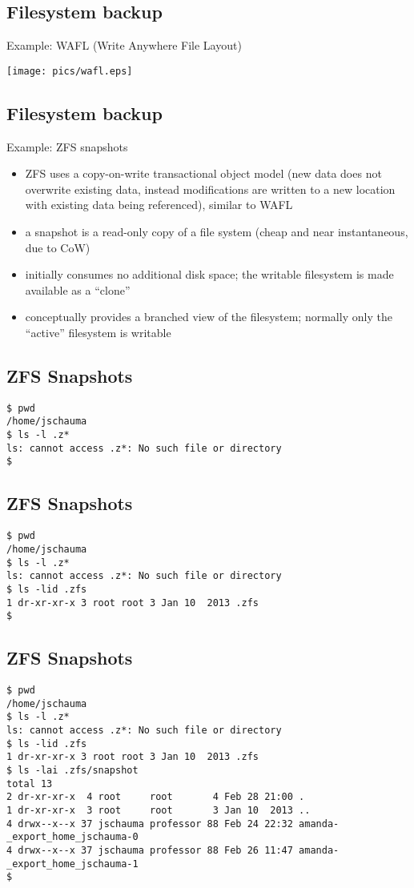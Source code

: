 \documentclass[xga]{xdvislides}
\begin{document}
\subsection{Filesystem backup}
Example: WAFL (Write Anywhere File Layout)
\vspace*{\fill}
\begin{center}
	\texttt{[image: pics/wafl.eps]}
\end{center}
\vspace*{\fill}


\subsection{Filesystem backup}
Example: ZFS snapshots
\begin{itemize}
	\item ZFS uses a copy-on-write transactional object model (new data does
		not overwrite existing data, instead modifications are written to a
		new location with existing data being referenced), similar to WAFL
	\item a snapshot is a read-only copy of a file system (cheap and near
		instantaneous, due to CoW)
	\item initially consumes no additional disk space; the writable filesystem
		is made available as a ``clone''
	\item conceptually provides a branched view of the filesystem; normally
		only the ``active'' filesystem is writable
\end{itemize}

\subsection{ZFS Snapshots}
\smallish
\begin{verbatim}
$ pwd
/home/jschauma
$ ls -l .z*
ls: cannot access .z*: No such file or directory
$
\end{verbatim}
\Normalsize

\subsection{ZFS Snapshots}
\smallish
\begin{verbatim}
$ pwd
/home/jschauma
$ ls -l .z*
ls: cannot access .z*: No such file or directory
$ ls -lid .zfs
1 dr-xr-xr-x 3 root root 3 Jan 10  2013 .zfs
$
\end{verbatim}
\Normalsize

\subsection{ZFS Snapshots}
\smallish
\begin{verbatim}
$ pwd
/home/jschauma
$ ls -l .z*
ls: cannot access .z*: No such file or directory
$ ls -lid .zfs
1 dr-xr-xr-x 3 root root 3 Jan 10  2013 .zfs
$ ls -lai .zfs/snapshot
total 13
2 dr-xr-xr-x  4 root     root       4 Feb 28 21:00 .
1 dr-xr-xr-x  3 root     root       3 Jan 10  2013 ..
4 drwx--x--x 37 jschauma professor 88 Feb 24 22:32 amanda-_export_home_jschauma-0
4 drwx--x--x 37 jschauma professor 88 Feb 26 11:47 amanda-_export_home_jschauma-1
$
\end{verbatim}
\Normalsize
\end{document}
